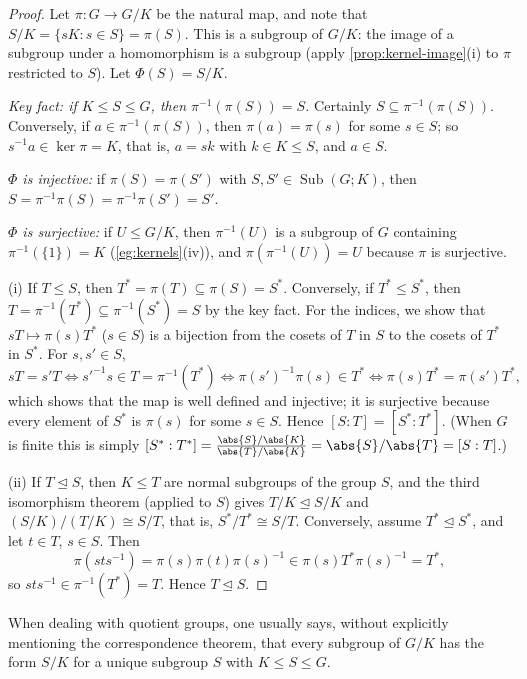 \begin{proof}
	Let \(\pi\colon G \to G/K\) be the natural map, and note that
	\(S/K = \{sK : s \in S\} = \pi(S)\). This is a subgroup of \(G/K\): the image of a
	subgroup under a homomorphism is a subgroup (apply \autoref{prop:kernel-image}(i) to
	\(\pi\) restricted to \(S\)). Let \(\Phi(S) = S/K\).

	\emph{Key fact: if \(K \leq S \leq G\), then \(\pi^{-1}(\pi(S)) = S\).} Certainly
	\(S \subseteq \pi^{-1}(\pi(S))\). Conversely, if \(a \in \pi^{-1}(\pi(S))\), then
	\(\pi(a) = \pi(s)\) for some \(s \in S\); so \(s^{-1}a \in \ker\pi = K\), that is,
	\(a = sk\) with \(k \in K \leq S\), and \(a \in S\).

	\emph{\(\Phi\) is injective:} if \(\pi(S) = \pi(S')\) with \(S, S' \in
	\operatorname{Sub}(G;K)\), then \(S = \pi^{-1}\pi(S) = \pi^{-1}\pi(S') = S'\).

	\emph{\(\Phi\) is surjective:} if \(U \leq G/K\), then \(\pi^{-1}(U)\) is a subgroup of
	\(G\) containing \(\pi^{-1}(\{1\}) = K\) (\autoref{eg:kernels}(iv)), and
	\(\pi(\pi^{-1}(U)) = U\) because \(\pi\) is surjective.

	(i) If \(T \leq S\), then \(T^* = \pi(T) \subseteq \pi(S) = S^*\). Conversely, if
	\(T^* \leq S^*\), then \(T = \pi^{-1}(T^*) \subseteq \pi^{-1}(S^*) = S\) by the key fact.
	For the indices, we show that \(sT \mapsto \pi(s)T^*\) (\(s \in S\)) is a bijection from
	the cosets of \(T\) in \(S\) to the cosets of \(T^*\) in \(S^*\). For \(s, s' \in S\),
	\[
		sT = s'T \iff s'^{-1}s \in T = \pi^{-1}(T^*) \iff \pi(s')^{-1}\pi(s) \in T^*
		\iff \pi(s)T^* = \pi(s')T^*,
	\]
	which shows that the map is well defined and injective; it is surjective because every
	element of \(S^*\) is \(\pi(s)\) for some \(s \in S\). Hence \([S : T] = [S^* : T^*]\).
	(When \(G\) is finite this is simply
	\([S^*:T^*] = \frac{\abs{S}/\abs{K}}{\abs{T}/\abs{K}} = \abs{S}/\abs{T} = [S:T]\).)

	(ii) If \(T \trianglelefteq S\), then \(K \leq T\) are normal subgroups of the group
	\(S\), and the third isomorphism theorem (applied to \(S\)) gives
	\(T/K \trianglelefteq S/K\) and \((S/K)/(T/K) \cong S/T\), that is,
	\(S^*/T^* \cong S/T\). Conversely, assume \(T^* \trianglelefteq S^*\), and let
	\(t \in T\), \(s \in S\). Then
	\[
		\pi(sts^{-1}) = \pi(s)\pi(t)\pi(s)^{-1} \in \pi(s)T^*\pi(s)^{-1} = T^*,
	\]
	so \(sts^{-1} \in \pi^{-1}(T^*) = T\). Hence \(T \trianglelefteq S\).
\end{proof}

When dealing with quotient groups, one usually says, without explicitly mentioning the
correspondence theorem, that every subgroup of \(G/K\) has the form \(S/K\) for a unique
subgroup \(S\) with \(K \leq S \leq G\).

